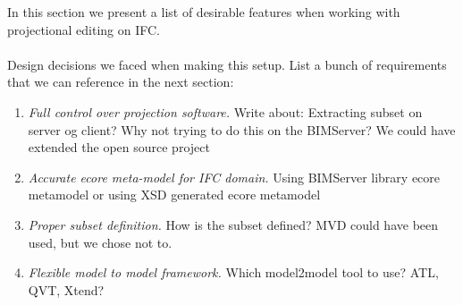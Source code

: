 In this section we present a list of desirable features when working with projectional editing on IFC.
\paragraph{}
Design decisions we faced when making this setup. List a bunch of requirements that we can reference in the next section:
\begin{enumerate}[itemsep=0pt,parsep=2pt,topsep=10pt]
	\item {\it Full control over projection software.} Write about: Extracting subset on server og client? Why not trying to do this on the BIMServer? We could have extended the open source project
	\item {\it Accurate ecore meta-model for IFC domain.} Using BIMServer library ecore metamodel or using XSD generated ecore metamodel
	\item {\it Proper subset definition.} How is the subset defined? MVD could have been used, but we chose not to.
	\item {\it Flexible model to model framework.} Which model2model tool to use? ATL, QVT, Xtend?
\end{enumerate}
